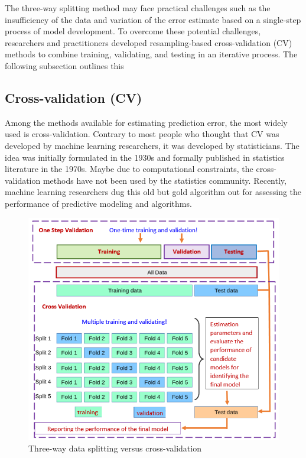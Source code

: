 \documentclass[
]{book}
\begin{document}
The three-way splitting method may face practical challenges such as the insufficiency of the data and variation of the error estimate based on a single-step process of model development. To overcome these potential challenges, researchers and practitioners developed resampling-based cross-validation (CV) methods to combine training, validating, and testing in an iterative process. The following subsection outlines this

\hypertarget{cross-validation-cv}{%
\subsection{Cross-validation (CV)}\label{cross-validation-cv}}

Among the methods available for estimating prediction error, the most widely used is cross-validation. Contrary to most people who thought that CV was developed by machine learning researchers, it was developed by statisticians. The idea was initially formulated in the 1930s and formally published in statistics literature in the 1970s. Maybe due to computational constraints, the cross-validation methods have not been used by the statistics community. Recently, machine learning researchers dug this old but gold algorithm out for assessing the performance of predictive modeling and algorithms.

\begin{figure}

{\centering \includegraphics[width=0.7\linewidth]{img08/w08-One-step-vs-CV} 

}

\caption{Three-way data splitting versus cross-validation}\label{fig:unnamed-chunk-127}
\end{figure}
\end{document}
